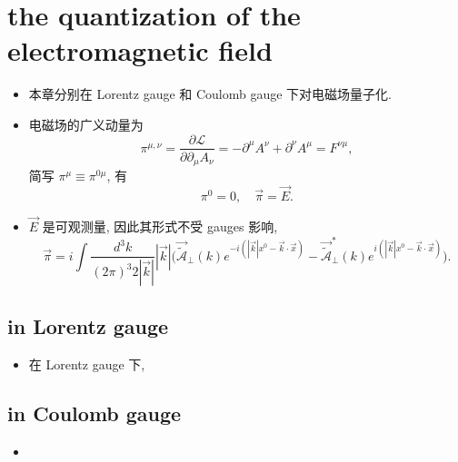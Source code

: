 \chapter{the quantization of the electromagnetic field}
\begin{itemize}
	\item 本章分别在 Lorentz gauge 和 Coulomb gauge 下对电磁场量子化.
	
	\item 电磁场的广义动量为
	\begin{equation}
		\pi^{\mu, \nu} = \frac{\partial \mathcal{L}}{\partial \partial_\mu A_\nu} = - \partial^\mu A^\nu + \partial^\nu A^\mu = F^{\nu \mu},
	\end{equation}
	简写 $\pi^\mu \equiv \pi^{0 \mu}$, 有
	\begin{equation}
		\pi^0 = 0, \quad \vec{\pi} = \vec{E}.
	\end{equation}
	
	\item $\vec{E}$ 是可观测量, 因此其形式不受 gauges 影响,
	\begin{equation}
		\vec{\pi} = i \int \frac{d^3 k}{(2 \pi)^3 2 |\vec{k}|} |\vec{k}| \Big( \vec{\tilde{\mathcal{A}}}_\perp(k) e^{- i (|\vec{k}| x^0 - \vec{k} \cdot \vec{x})} - \vec{\tilde{\mathcal{A}}}^*_\perp(k) e^{i (|\vec{k}| x^0 - \vec{k} \cdot \vec{x})} \Big).
	\end{equation}
\end{itemize}

\section{in Lorentz gauge}
\begin{itemize}
	\item 在 Lorentz gauge 下,
\end{itemize}

\section{in Coulomb gauge}
\begin{itemize}
	\item 
\end{itemize}
